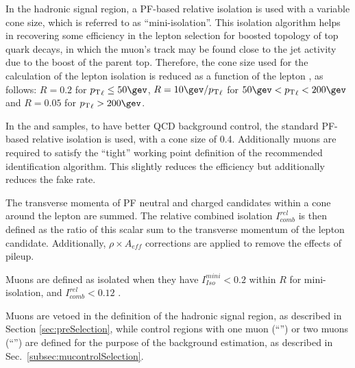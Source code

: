 In the hadronic signal region, a PF-based relative isolation is used with a variable cone size, which is referred to as ``mini-isolation''. 
This isolation algorithm helps in recovering some efficiency in the lepton selection for boosted topology of top quark decays, 
in which the muon's track may be found close to the jet activity due to the boost of the parent top. 
Therefore, the cone size used for the calculation of the lepton isolation is reduced as a function of 
the lepton \Pt, as follows: $R=0.2$ for $\Pt_{\ell}\leq50\gev$,
$R=10\gev/\Pt_{\ell}$ for $50 \gev < \Pt_{\ell} < 200\gev$ and $R=0.05$ for $\Pt_{\ell} > 200 \gev$.

In the \mj and \mmj samples, to have better QCD background control,
the standard PF-based relative isolation is used, with a cone size of
0.4. Additionally muons are required to satisfy the ``tight'' working
point definition of the recommended identification algorithm. This
slightly reduces the efficiency but additionally reduces the fake
rate.

The transverse momenta of PF neutral and charged candidates within a cone around the lepton are summed. 
The relative combined isolation $I^{rel}_{comb}$ is then defined as 
the ratio of this scalar sum to the transverse momentum of the lepton
candidate. Additionally, $\rho\times A_{eff}$ corrections are applied to
remove the effects of pileup.

Muons are defined as isolated when they have $I^{mini}_{Iso} < 0.2$ within $R$ for mini-isolation, and $I^{rel}_{comb} < 0.12$ .


Muons are vetoed in the definition of the hadronic signal region, 
as described in Section \ref{sec:preSelection}, while 
control regions with one muon (``\mj'') or two muons (``\mmj'') are defined for the purpose of the background estimation, 
as described in Sec.~\ref{subsec:mucontrolSelection}.

